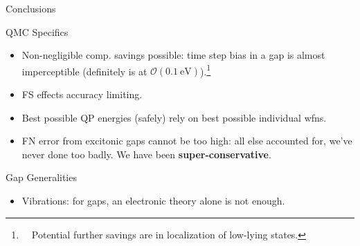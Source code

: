 \documentclass[10pt, pdf, hyperref={draft}, usenames, dvipsnames]{beamer}
\begin{document}
\begin{frame}{Conclusions}

\begin{block}{QMC Specifics}
\begin{itemize}
  \item Non-negligible comp. savings possible: time step bias in a gap is
  almost imperceptible (definitely is at $\mathcal{O}(0.1\
  \text{eV})$).\footnote{~~Potential further savings are in localization of
  low-lying states.}
  \item FS effects accuracy limiting.
  \item Best possible QP energies (safely) rely on best possible individual wfns.
  \item FN error from excitonic gaps cannot be too high: all else accounted
  for, we've never done too badly. We have been
    \textbf{super-conservative}.
\end{itemize}
\end{block}

\begin{block}{Gap Generalities}
\begin{itemize}

  \item Vibrations: for gaps, an electronic theory alone is not enough.

\end{itemize}
\end{block}

\end{frame}
\end{document}

